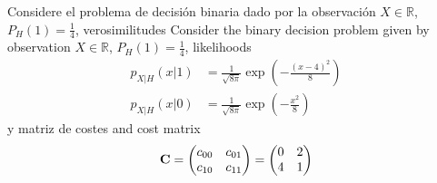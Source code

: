 \question[20]

\ifspanish Considere el problema de decisión binaria dado por la observación $X \in \mathbb{R}$, $P_H(1)=\frac14$, verosimilitudes
\else Consider the binary decision problem given by observation $X \in \mathbb{R}$, $P_H(1)=\frac14$, likelihoods \fi
\begin{align*}
p_{X|H}(x|1) &= \frac{1}{\sqrt{8\pi}} \exp\left(-\frac{(x-4)^2}8 \right)   \\
p_{X|H}(x|0) &= \frac{1}{\sqrt{8\pi}} \exp\left(-\frac{x^2}8     \right)
\end{align*}
\ifspanish y matriz de costes \else and cost matrix \fi
\begin{align*}
{\bf C}
    = \begin{pmatrix} 
      c_{00} & c_{01}  \\
      c_{10} & c_{11}
      \end{pmatrix}
    = \begin{pmatrix} 
      0 & 2  \\
      4 & 1
      \end{pmatrix}
\end{align*}


